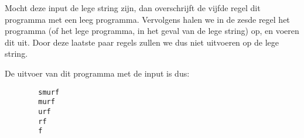 \begin{exmp}
	Mocht deze input de lege string zijn, dan overschrijft de vijfde regel dit
	programma met een leeg programma. Vervolgens halen we in de zesde regel het
	programma (of het lege programma, in het geval van de lege string) op, en
	voeren dit uit. Door deze laatste paar regels zullen we dus niet
	 uitvoeren op de lege string.

	\medskip
	De uitvoer van dit programma met de input  is dus:

	\begin{verbatim}
		smurf
		murf
		urf
		rf
		f
	\end{verbatim}
\end{exmp}

